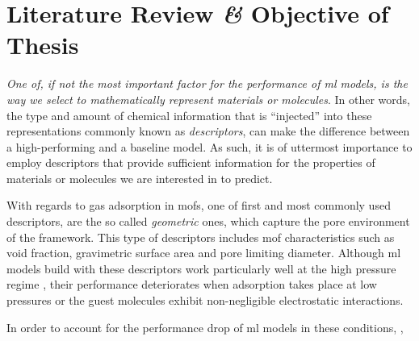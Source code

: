 
\section{Literature Review \textit{\&} Objective of Thesis}

\emph{One of, if not the most important factor for the performance of \gls{ml}
models, is the way we select to mathematically represent materials or
molecules}. In other words, the type and amount of chemical information that is
``injected'' into these representations commonly known as
\emph{descriptors}, can make the difference between a
high-performing and a baseline model. As such, it is of uttermost importance to
employ descriptors that provide sufficient information for the properties of
materials or molecules we are interested in to predict.

With regards to gas adsorption in \glspl{mof}, one of first and most commonly
used descriptors, are the so called \emph{geometric} ones, which capture the pore environment of the framework. This
type of descriptors includes \gls{mof} characteristics such as void
fraction, gravimetric surface area and pore limiting diameter. Although
\gls{ml} models build with these descriptors work particularly well at the high
pressure regime \parencite{Fernandez2013}, their performance deteriorates when
adsorption takes place at low pressures or the guest molecules exhibit
non-negligible electrostatic interactions.

In order to account for the performance drop of \gls{ml} models in these
conditions, \cite{Fernandez2013},

